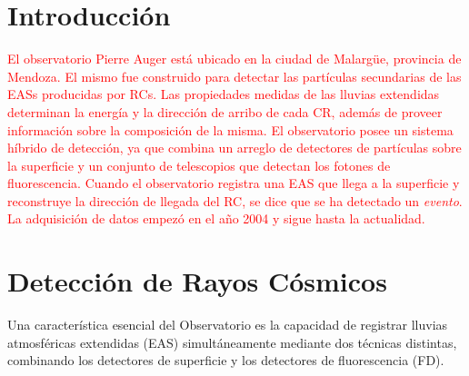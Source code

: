 

\section{Introducción}

\textcolor{red}{El observatorio Pierre Auger está ubicado en la ciudad de Malargüe, provincia de Mendoza. El mismo fue construido para detectar las partículas secundarias de las EASs producidas por RCs.  Las propiedades medidas de las lluvias extendidas determinan la energía y la dirección de arribo de cada CR, además de proveer información sobre  la composición de la  misma. El observatorio posee un sistema híbrido de detección, ya que combina un arreglo de detectores de partículas sobre la superficie y un conjunto de telescopios que detectan los fotones de fluorescencia. Cuando el observatorio  registra una EAS que llega a la superficie y reconstruye la dirección de llegada del RC, se dice que se ha detectado un \textit{evento}. La adquisición de datos empezó en el año 2004 y sigue hasta la actualidad.}


\section{Detección de Rayos Cósmicos}
Una característica esencial del Observatorio es la capacidad de registrar lluvias atmosféricas extendidas (EAS) simultáneamente mediante dos técnicas distintas, combinando los detectores de superficie y los detectores de fluorescencia (FD). 



